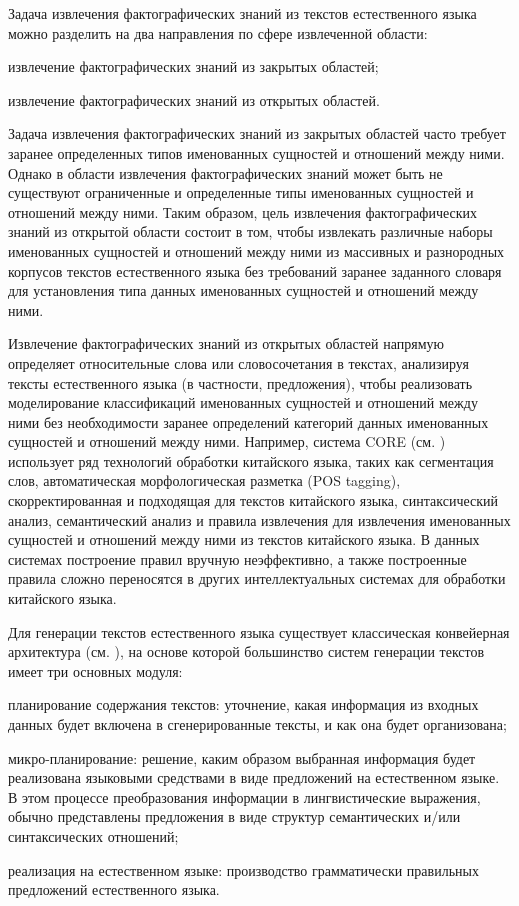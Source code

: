 Задача извлечения фактографических знаний из текстов естественного языка можно разделить на два направления по сфере извлеченной области:
\begin{textitemize}
	\item извлечение фактографических знаний из закрытых областей;
	\item извлечение фактографических знаний из открытых областей.
\end{textitemize}

Задача извлечения фактографических знаний из закрытых областей часто требует заранее определенных типов именованных сущностей и отношений между ними. Однако в области извлечения фактографических знаний может быть не существуют ограниченные и определенные типы именованных сущностей и отношений между ними. Таким образом, цель извлечения фактографических знаний из открытой области состоит в том, чтобы извлекать различные наборы именованных сущностей и отношений между ними из массивных и разнородных корпусов текстов естественного языка без требований заранее заданного словаря для установления типа данных именованных сущностей и отношений между ними.

Извлечение фактографических знаний из открытых областей напрямую определяет относительные слова или словосочетания в текстах, анализируя тексты естественного языка (в частности, предложения), чтобы реализовать моделирование классификаций именованных сущностей и отношений между ними без необходимости заранее определений категорий данных именованных сущностей и отношений между ними.  Например, система CORE (см. ) использует ряд технологий обработки китайского языка, таких как сегментация слов, автоматическая морфологическая разметка (POS tagging), скорректированная и подходящая для текстов китайского языка, синтаксический анализ, семантический анализ и правила извлечения для извлечения именованных сущностей и отношений между ними из текстов китайского языка. В данных системах построение правил вручную неэффективно, а также построенные правила сложно переносятся в других интеллектуальных системах для обработки китайского языка.

Для генерации текстов естественного языка существует классическая конвейерная архитектура (см. ), на основе которой большинство систем генерации текстов имеет три основных модуля:
\begin{textitemize}
	\item планирование содержания текстов: уточнение, какая информация из входных данных будет включена в сгенерированные тексты, и как она будет организована;
	\item микро-планирование: решение, каким образом выбранная информация будет реализована языковыми средствами в виде предложений на естественном языке. В этом процессе преобразования информации в лингвистические выражения, обычно представлены предложения в виде структур семантических и/или синтаксических отношений;
	\item реализация на естественном языке: производство грамматически правильных предложений естественного языка.
\end{textitemize}

